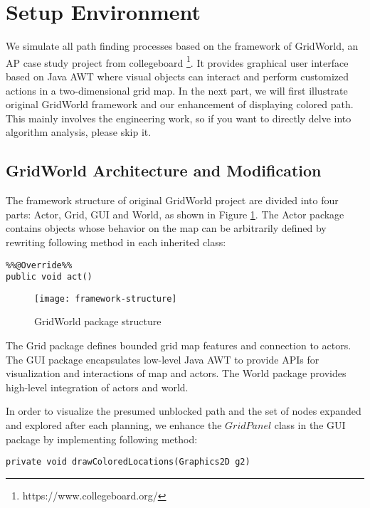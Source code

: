 \section{Setup Environment}

We simulate all path finding processes based on the framework of 
GridWorld\cite{web:gridworld}, an AP case study project from collegeboard
\footnote{https://www.collegeboard.org/}. It provides graphical user interface 
based on Java AWT where visual objects can interact and perform customized 
actions in a two-dimensional grid map. In the next part, we will first illustrate
original GridWorld framework and our enhancement of displaying colored path.
This mainly involves the engineering work, so if you want to directly delve 
into algorithm analysis, please skip it.

\subsection{GridWorld Architecture and Modification}

The framework structure of original GridWorld project are divided into four parts: 
Actor, Grid, GUI and World, as shown in Figure \ref{fig:framework-structure}.
The Actor package contains objects whose behavior on the map can be arbitrarily 
defined by rewriting following method in each inherited class:

\begin{lstlisting}
%%@Override%%
public void act()
\end{lstlisting}

\begin{figure}[ht]
\centering
\texttt{[image: framework-structure]}
\caption{GridWorld package structure}
\label{fig:framework-structure}
\end{figure}

The Grid package defines bounded grid
map features and connection to actors. The GUI package encapsulates low-level
Java AWT to provide APIs for visualization and interactions of map and actors.
The World package provides high-level integration of actors and world.

In order to visualize the presumed unblocked path and the set of nodes expanded
and explored after each planning, we enhance the $GridPanel$ class in the 
GUI package by implementing following method:

\begin{lstlisting}
private void drawColoredLocations(Graphics2D g2)
\end{lstlisting}

